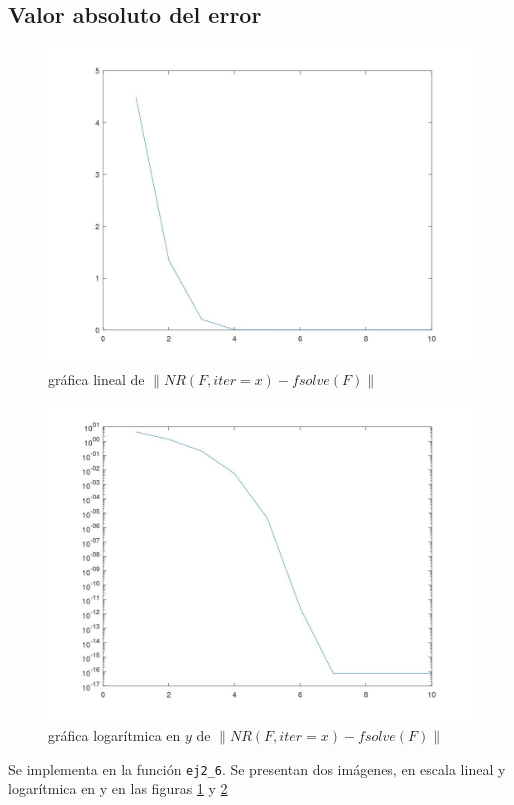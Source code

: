 \documentclass{endm}
\begin{document}
\subsection{Valor absoluto del error}
\begin{figure}[htbp]
  \includegraphics[scale=0.25]{ej_2_6_1.jpg}
  \caption{gráfica lineal de $\| NR(F,iter=x) - fsolve(F) \| $}
  \label{fig:2.6.1}
\end{figure}
\begin{figure}[htbp]
  \includegraphics[scale=0.25]{ej_2_6_2.jpg}
  \caption{gráfica logarítmica en $y$ de $\| NR(F,iter=x) - fsolve(F) \| $}
  \label{fig:2.6.2}
\end{figure}
Se implementa en la función  \lstinline[style=mystyle]{ej2_6}. Se presentan dos imágenes, en escala lineal y logarítmica en y en las figuras \ref{fig:2.6.1} y \ref{fig:2.6.2}
\end{document}
